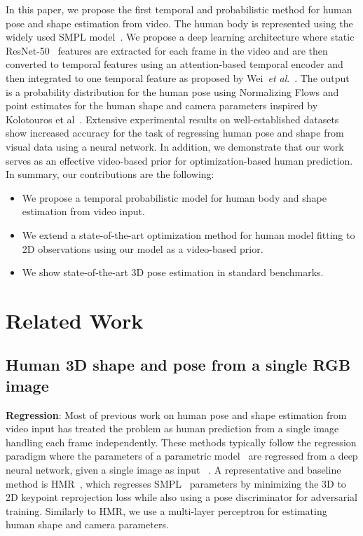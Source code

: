 \documentclass[runningheads]{llncs}
\newcommand{\etal}{\textit{et al}.}
\begin{document}
In this paper, we propose the first temporal and probabilistic method for human pose and shape estimation from video. The human body is represented using the widely used SMPL model~\cite{SMPL:2015}. We propose a deep learning architecture where static ResNet-50~\cite{7780459} features are extracted for each frame in the video and are then converted to temporal features using an attention-based temporal encoder and then integrated to one temporal feature as proposed by Wei~\etal~\cite{WeiLin2022mpsnet}. The output is a probability distribution for the human pose using Normalizing Flows
and point estimates for the human shape and camera parameters inspired by Kolotouros et al~\cite{kolotouros2021prohmr}. Extensive experimental results on well-established datasets show increased accuracy for the task of regressing human pose and shape from visual data using a neural network. In addition, we demonstrate that our work serves as an effective video-based prior for optimization-based human prediction.  
In summary, our contributions are the following:
 \begin{itemize}
     \item We propose a temporal probabilistic model for human body and shape estimation from video input.
     
     \item We extend a state-of-the-art optimization method for human model fitting to 2D observations using our model as a video-based prior. 
     
     \item We show state-of-the-art 3D pose estimation in standard benchmarks.

 \end{itemize}
 \section{Related Work}
\subsection{Human 3D shape and pose from a single RGB image}


\vspace*{0.1cm}\noindent\textbf{Regression}: Most of previous work on human pose and shape estimation from video input has treated the problem as human prediction from a single image handling each frame independently. These methods typically follow the regression paradigm where the parameters of a parametric model~\cite{SMPL:2015,SMPL-X:2019} are regressed from a deep neural network, given a single image as input ~\cite{guler2019holopose,kolotouros2019convolutional,pavlakos2019texturepose,choutas2020monocular,georgakis2020hierarchical,jiang2020coherent}.
A representative and baseline method is HMR~\cite{kanazawaHMR18}, which regresses SMPL~\cite{SMPL:2015} parameters by minimizing the 3D to 2D keypoint reprojection loss while also using a pose discriminator for adversarial training. Similarly to HMR, we use a multi-layer perceptron for estimating human shape and camera parameters.\\
\end{document}
